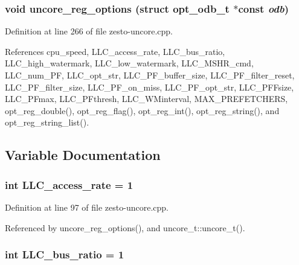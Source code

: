 \subsubsection[{uncore\_\-reg\_\-options}]{\setlength{\rightskip}{0pt plus 5cm}void uncore\_\-reg\_\-options (struct {\bf opt\_\-odb\_\-t} $\ast$const  {\em odb})}\label{zesto-uncore_8cpp_1c33c2be874ac3de83db43002cde412e}




Definition at line 266 of file zesto-uncore.cpp.

References cpu\_\-speed, LLC\_\-access\_\-rate, LLC\_\-bus\_\-ratio, LLC\_\-high\_\-watermark, LLC\_\-low\_\-watermark, LLC\_\-MSHR\_\-cmd, LLC\_\-num\_\-PF, LLC\_\-opt\_\-str, LLC\_\-PF\_\-buffer\_\-size, LLC\_\-PF\_\-filter\_\-reset, LLC\_\-PF\_\-filter\_\-size, LLC\_\-PF\_\-on\_\-miss, LLC\_\-PF\_\-opt\_\-str, LLC\_\-PFFsize, LLC\_\-PFmax, LLC\_\-PFthresh, LLC\_\-WMinterval, MAX\_\-PREFETCHERS, opt\_\-reg\_\-double(), opt\_\-reg\_\-flag(), opt\_\-reg\_\-int(), opt\_\-reg\_\-string(), and opt\_\-reg\_\-string\_\-list().

\subsection{Variable Documentation}
\subsubsection[{LLC\_\-access\_\-rate}]{\setlength{\rightskip}{0pt plus 5cm}int {\bf LLC\_\-access\_\-rate} = 1\hspace{0.3cm}{\tt  [static]}}\label{zesto-uncore_8cpp_da74c477fcd91525690b3e4da33f8f18}




Definition at line 97 of file zesto-uncore.cpp.

Referenced by uncore\_\-reg\_\-options(), and uncore\_\-t::uncore\_\-t().
\subsubsection[{LLC\_\-bus\_\-ratio}]{\setlength{\rightskip}{0pt plus 5cm}int {\bf LLC\_\-bus\_\-ratio} = 1\hspace{0.3cm}{\tt  [static]}}\label{zesto-uncore_8cpp_792d5ffd2dbfc36a67a2d5e49f178148}




